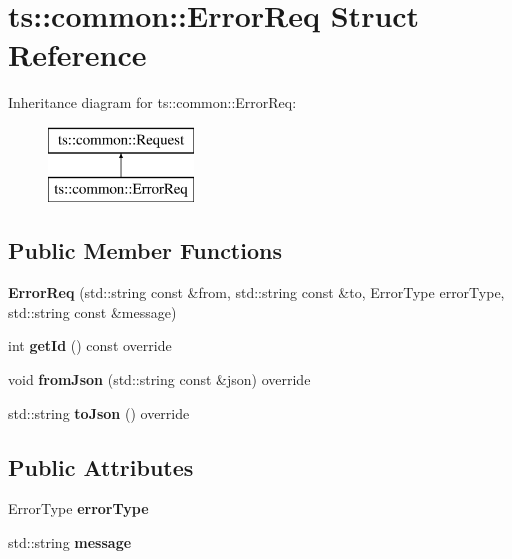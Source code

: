 \hypertarget{structts_1_1common_1_1_error_req}{}\section{ts\+:\+:common\+:\+:Error\+Req Struct Reference}
\label{structts_1_1common_1_1_error_req}
Inheritance diagram for ts\+:\+:common\+:\+:Error\+Req\+:\begin{figure}[H]
\begin{center}
\leavevmode
\includegraphics[height=2.000000cm]{structts_1_1common_1_1_error_req}
\end{center}
\end{figure}
\subsection*{Public Member Functions}
\begin{DoxyCompactItemize}
\item 
\mbox{\label{structts_1_1common_1_1_error_req_a5bdeb0a76687e0e23b840064b873d343}} 
{\bfseries Error\+Req} (std\+::string const \&from, std\+::string const \&to, Error\+Type error\+Type, std\+::string const \&message)
\item 
\mbox{\label{structts_1_1common_1_1_error_req_a67b8214db379d0d61a1b421721936bda}} 
int {\bfseries get\+Id} () const override
\item 
\mbox{\label{structts_1_1common_1_1_error_req_af102b4aa668b10b75eeaf670e0614a44}} 
void {\bfseries from\+Json} (std\+::string const \&json) override
\item 
\mbox{\label{structts_1_1common_1_1_error_req_af42acd775e96ad61907815ab74ef3961}} 
std\+::string {\bfseries to\+Json} () override
\end{DoxyCompactItemize}
\subsection*{Public Attributes}
\begin{DoxyCompactItemize}
\item 
\mbox{\label{structts_1_1common_1_1_error_req_a0183447ba33cb20a07e73492070b017f}} 
Error\+Type {\bfseries error\+Type}
\item 
\mbox{\label{structts_1_1common_1_1_error_req_afe7707a51692975f1e221dd43504f799}} 
std\+::string {\bfseries message}
\end{DoxyCompactItemize}
